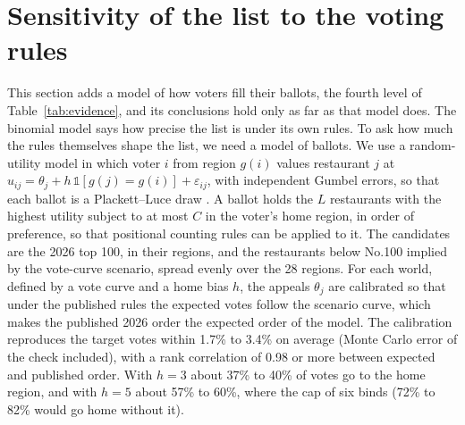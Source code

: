 \documentclass[11pt,a4paper]{article}
\begin{document}
\section{Sensitivity of the list to the voting rules}\label{sec:gsa}

This section adds a model of how voters fill their ballots, the fourth level of Table~\ref{tab:evidence}, and its conclusions hold only as far as that model does. The binomial model says how precise the list is under its own rules. To ask how much the rules themselves shape the list, we need a model of ballots. We use a random-utility model in which voter $i$ from region $g(i)$ values restaurant $j$ at $u_{ij} = \theta_j + h\,\mathbb{1}[g(j) = g(i)] + \varepsilon_{ij}$, with independent Gumbel errors, so that each ballot is a Plackett--Luce draw \citep{luce1959,plackett1975}. A ballot holds the $L$ restaurants with the highest utility subject to at most $C$ in the voter's home region, in order of preference, so that positional counting rules can be applied to it. The candidates are the 2026 top 100, in their regions, and the restaurants below No.100 implied by the vote-curve scenario, spread evenly over the 28 regions. For each world, defined by a vote curve and a home bias $h$, the appeals $\theta_j$ are calibrated so that under the published rules the expected votes follow the scenario curve, which makes the published 2026 order the expected order of the model. The calibration reproduces the target votes within 1.7\% to 3.4\% on average (Monte Carlo error of the check included), with a rank correlation of 0.98 or more between expected and published order. With $h = 3$ about 37\% to 40\% of votes go to the home region, and with $h = 5$ about 57\% to 60\%, where the cap of six binds (72\% to 82\% would go home without it).
\end{document}
